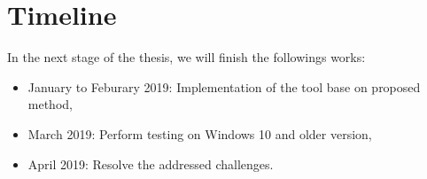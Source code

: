 \section[Timeline]{Timeline}

In the next stage of the thesis, we will finish the followings works:

\begin{itemize}
  \item January to Feburary 2019: Implementation of the tool base on proposed method,
  \item March 2019: Perform testing on Windows 10 and older version,
  \item April 2019: Resolve the addressed challenges.
\end{itemize}
